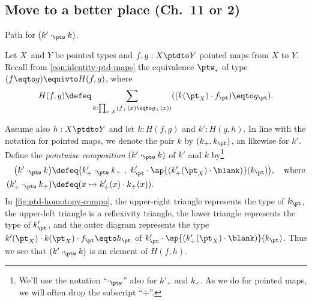 \subsection{Move to a better place (Ch.\ 11 or 2)}
\begin{marginfigure}
  \caption{\label{fig:ptd-homotopy-compo}
  Path for $(k'\cdot_{\protect\ptw} k)$.} 
\end{marginfigure}
\begin{definition}\label{def:ptd-homotopy-compo}
Let $X$ and $Y$ be pointed types and
$f,g: X\ptdto Y$ pointed maps from $X$ to $Y$.
Recall from \cref{con:identity-ptd-maps} the equivalence $\ptw_*$ of type 
$(f\eqto g) \equivto H(f,g)$, where 
\[ H(f,g) \defeq \sum_{k:\prod_{x:X}(f_\div(x)\eqto g_\div(x))}
                               ((k(\pt_X)\cdot f_\pt) \eqto g_\pt ).
\]

Assume also $h: X\ptdto Y$ and let $k: H(f,g)$ and 
$k': H(g,h)$. In line with the notation for pointed maps, 
we denote the pair $k$ by $(k_\div,k_\pt)$, an likewise for $k'$. 
Define the \emph{pointwise composition}
$(k'\cdot_{\ptw} k)$ of $k'$ and $k$ by\footnote{%
We'll use the notation ``$\cdot_{\ptw}$'' also for $k'_\div$ and $k_\div$.
As we do for pointed maps, we will often drop the subscript ``$\div$''.}
\begin{align*}
\bigl(k'\cdot_{\ptw} k\bigr)&\defeq
\bigl(k'_\div\cdot_{\ptw} k_\div ~,~ 
       k'_\pt\cdot\ap{(k'_\div(\pt_X)\cdot\blank)}(k_\pt)\bigr),
\quad\text{where}\\
(k'_\div\cdot_{\ptw} k_\div) &\defeq (x\mapsto k'_\div(x)\cdot k_\div(x)).
\end{align*}
In \cref{fig:ptd-homotopy-compo}, the upper-right triangle represents
the type of $k_\pt$, the upper-left triangle is a reflexivity triangle,
the lower triangle represents the type of $k'_\pt$,
and the outer diagram represents the type 
$k'(\pt_X)\cdot k(\pt_X)\cdot f_\pt \eqto h_\pt$
of $k'_\pt\cdot\ap{(k'_\div(\pt_X)\cdot\blank)}(k_\pt)$.
Thus we see that $(k'\cdot_{\ptw} k)$ is an element of $H(f,h)$.
\end{definition}

